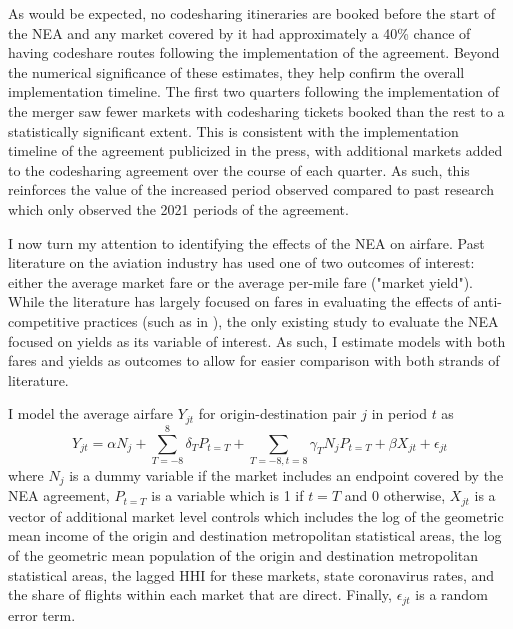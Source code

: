 \documentclass{article}
\begin{document}
	As would be expected, no codesharing itineraries are booked before the start of the NEA and any market covered by it had approximately a 40\% chance of having codeshare routes following the implementation of the agreement. Beyond the numerical significance of these estimates, they help confirm the overall implementation timeline. The first two quarters following the implementation of the merger saw fewer markets with codesharing tickets booked than the rest to a statistically significant extent. This is consistent with the implementation timeline of the agreement publicized in the press, with additional markets added to the codesharing agreement over the course of each quarter. As such, this reinforces the value of the increased period observed compared to past research which only observed the 2021 periods of the agreement. 
	
	I now turn my attention to identifying the effects of the NEA on airfare. Past literature on the aviation industry has used one of two outcomes of interest: either the average market fare or the average per-mile fare ("market yield").  While the literature has largely focused on fares in evaluating the effects of anti-competitive practices (such as in \citet{luo_price_2014, carlton_are_2019}), the only existing study \citep{zou_assessing_2023} to evaluate the NEA focused on yields as its variable of interest. As such, I estimate models with both fares and yields as outcomes to allow for easier comparison with both strands of literature. 

    I model the average airfare $Y_{jt}$ for origin-destination pair $j$ in period $t$ as \[Y_{jt} = \alpha N_{j} + \sum_{T = -8}^{8} \delta_{T} P_{t = T} + \sum_{T = -8, t = 8} \gamma_{T} N_{j} P_{t = T} + \beta X_{jt} + \epsilon_{jt}\] where $N_{j}$ is a dummy variable if the market includes an endpoint covered by the NEA agreement, $P_{t = T}$ is a variable which is 1 if $t = T$ and 0 otherwise, $X_{jt}$ is a vector of additional market level controls which includes the log of the geometric mean income of the origin and destination metropolitan statistical areas, the log of the geometric mean population of the origin and destination metropolitan statistical areas, the lagged HHI for these markets, state coronavirus rates, and the share of flights within each market that are direct. Finally, $\epsilon_{jt}$ is a random error term. 
\end{document}

